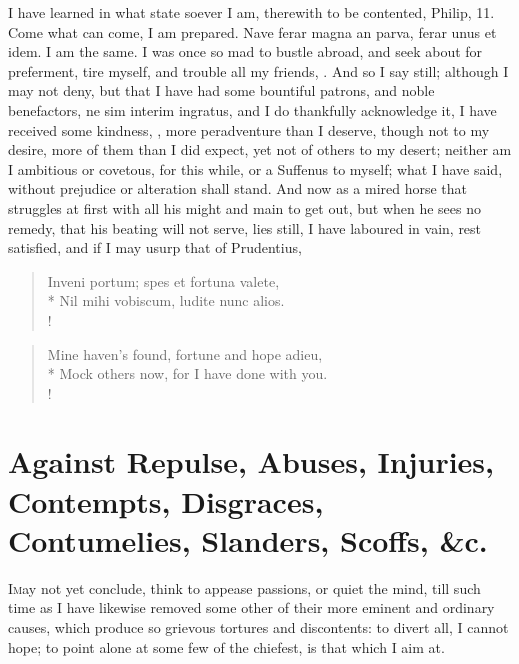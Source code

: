 {I have learned in what state soever I am, therewith to be contented,
Philip,  11. Come what can come, I am prepared. Nave ferar magna an
parva, ferar unus et idem. I am the same. I was once so mad to bustle
abroad, and seek about for preferment, tire myself, and trouble all my
friends, . And so I say still; although I may not
deny, but that I have had some  bountiful patrons, and noble
benefactors, ne sim interim ingratus, and I do thankfully acknowledge
it, I have received some kindness, , more peradventure than I
deserve, though not to my desire, more of them than I did expect, yet
not of others to my desert; neither am I ambitious or covetous, for
this while, or a Suffenus to myself; what I have said, without
prejudice or alteration shall stand. And now as a mired horse that
struggles at first with all his might and main to get out, but when he
sees no remedy, that his beating will not serve, lies still, I have
laboured in vain, rest satisfied, and if I may usurp that of
Prudentius,
%
\begin{latin}%
\begin{verse}%
Inveni portum; spes et fortuna valete,\\*
Nil mihi vobiscum, ludite nunc alios.\\!
\end{verse}%
\end{latin}%
\translationrule%
\begin{verse}%
Mine haven's found, fortune and hope adieu,\\*
Mock others now, for I have done with you.\\!
\end{verse}%
\section[Against Repulse, Abuses, Injuries \ldots{}]{Against Repulse, Abuses, Injuries, Contempts, Disgraces, Contumelies, Slanders, Scoffs, \&c.}

\lettrine{I} may not yet conclude, think to appease passions, or quiet the mind,
till such time as I have likewise removed some other of their more
eminent and ordinary causes, which produce so grievous tortures and
discontents: to divert all, I cannot hope; to point alone at some few
of the chiefest, is that which I aim at.

}
